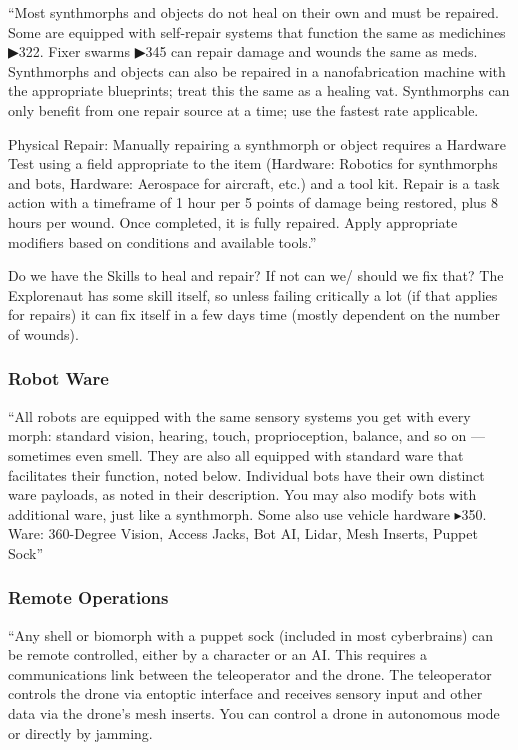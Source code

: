 “Most synthmorphs and objects do not heal on their own and must be repaired. Some are equipped with self-repair systems that function the same as medichines ▶322. Fixer swarms ▶345 can repair damage and wounds the same as meds. Synthmorphs and objects can also be repaired in a nanofabrication machine with the appropriate blueprints; treat this the same as a healing vat. Synthmorphs can only benefit from one repair source at a time; use the fastest rate applicable.

Physical Repair: Manually repairing a synthmorph or object requires a Hardware Test using a field appropriate to the item (Hardware: Robotics for synthmorphs and bots, Hardware: Aerospace for aircraft, etc.) and a tool kit. Repair is a task action with a timeframe of 1 hour per 5 points of damage being restored, plus 8 hours per wound. Once completed, it is fully repaired. Apply appropriate modifiers based on conditions and available tools.” \citep[pg. 221]{ep2e_1.1_2019}

Do we have the Skills to heal and repair? If not can we/ should we fix that? The Explorenaut has some skill itself, so unless failing critically a lot (if that applies for repairs) it can fix itself in a few days time (mostly dependent on the number of wounds).


\subsubsection{Robot Ware}

“All robots are equipped with the same sensory systems you get with every morph: standard vision, hearing, touch, proprioception, balance, and so on — sometimes even smell. They are also all equipped with standard ware that facilitates their function, noted below. Individual bots have their own distinct ware payloads, as noted in their description. You may also modify bots with additional ware, just like a synthmorph. Some also use vehicle hardware $\blacktriangleright$350. Ware: 360-Degree Vision, Access Jacks, Bot AI, Lidar, Mesh Inserts, Puppet Sock” \citep[pg. 346]{ep2e_1.1_2019}

\subsubsection{Remote Operations}

“Any shell or biomorph with a puppet sock (included in most cyberbrains) can be remote controlled, either by a character or an AI. This requires a communications link between the teleoperator and the drone. The teleoperator controls the drone via entoptic interface and receives sensory input and other data via the drone’s mesh inserts. You can control a drone in autonomous mode or directly by jamming.

